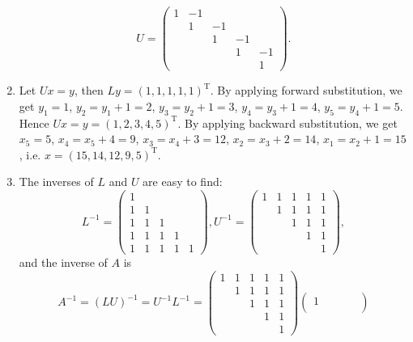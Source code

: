 \documentclass[a4paper,11pt]{article}
\begin{document}
\begin{enumerate}
$$         U = \begin{pmatrix}
               1 & -1 &  &  &  \\
                & 1 & -1 &  &  \\
                &  & 1 & -1 &  \\
                &  &  & 1 & -1 \\
                &  &  &  & 1
             \end{pmatrix}. $$
      \item Let $Ux = y$, then $Ly = (1, 1, 1, 1, 1)^{\text{T}}$. By applying forward substitution, we get $y_1 = 1$, $y_2 = y_1 + 1 = 2$, $y_3 = y_2 + 1 = 3$, $y_4 = y_3 + 1 = 4$, $y_5 = y_4+1 = 5$. Hence $Ux = y = (1, 2, 3, 4, 5)^{\text{T}}$. By applying backward substitution, we get $x_5 = 5$, $x_4 = x_5+4 = 9$, $x_3 = x_4+3 = 12$, $x_2 = x_3 + 2 = 14$, $x_1 = x_2 + 1 = 15$, i.e. $x = (15, 14, 12 ,9, 5)^{\text{T}}$.
      \item The inverses of $L$ and $U$ are easy to find:
      $$ L^{-1} =
          \begin{pmatrix}
            1 &  &  &  &  \\
            1 & 1 &  &  &  \\
            1 & 1 & 1 &  &  \\
            1 & 1 & 1 & 1 &  \\
            1 & 1 & 1 & 1 & 1
          \end{pmatrix},
           U^{-1} =
          \begin{pmatrix}
            1 & 1 & 1 & 1 & 1 \\
             & 1 & 1 & 1 & 1 \\
             &  & 1 & 1 & 1 \\
             &  &  & 1 & 1 \\
             &  &  &  & 1
          \end{pmatrix}, $$
          and the inverse of $A$ is
          $$ A^{-1} = (LU)^{-1} = U^{-1}L^{-1} =
          \begin{pmatrix}
            1 & 1 & 1 & 1 & 1 \\
             & 1 & 1 & 1 & 1 \\
             &  & 1 & 1 & 1 \\
             &  &  & 1 & 1 \\
             &  &  &  & 1
          \end{pmatrix}
          \begin{pmatrix}
            1 &  &  &  &  \\

\end{pmatrix}$$
\end{enumerate}
\end{document}
